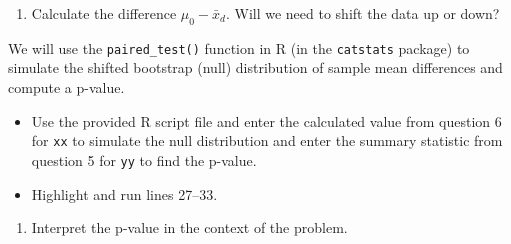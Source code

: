 \documentclass[
]{report}
\newenvironment{Shaded}{\begin{snugshade}}{\end{snugshade}}
\newcommand{\AttributeTok}[1]{\textcolor[rgb]{0.13,0.29,0.53}{#1}}
\newcommand{\CommentTok}[1]{\textcolor[rgb]{0.56,0.35,0.01}{\textit{#1}}}
\newcommand{\DecValTok}[1]{\textcolor[rgb]{0.00,0.00,0.81}{#1}}
\newcommand{\FunctionTok}[1]{\textcolor[rgb]{0.13,0.29,0.53}{\textbf{#1}}}
\newcommand{\NormalTok}[1]{#1}
\newcommand{\SpecialCharTok}[1]{\textcolor[rgb]{0.81,0.36,0.00}{\textbf{#1}}}
\newcommand{\StringTok}[1]{\textcolor[rgb]{0.31,0.60,0.02}{#1}}
\providecommand{\tightlist}{%
  \setlength{\itemsep}{0pt}\setlength{\parskip}{0pt}}
\begin{document}
\begin{enumerate}
\def\labelenumi{\arabic{enumi}.}
\setcounter{enumi}{5}
\tightlist
\item
  Calculate the difference \(\mu_0 - \bar{x}_d\). Will we need to shift the data up or down?
\end{enumerate}

\vspace{.7in}
\newpage

We will use the \texttt{paired\_test()} function in R (in the \texttt{catstats} package) to simulate the shifted bootstrap (null) distribution of sample mean differences and compute a p-value.

\begin{itemize}
\item
  Use the provided R script file and enter the calculated value from question 6 for \texttt{xx} to simulate the null distribution and enter the summary statistic from question 5 for \texttt{yy} to find the p-value.
\item
  Highlight and run lines 27--33.
\end{itemize}

\begin{Shaded}
\end{Shaded}

\begin{enumerate}
\def\labelenumi{\arabic{enumi}.}
\setcounter{enumi}{6}
\tightlist
\item
  Interpret the p-value in the context of the problem.
  \vspace{1in}
\end{enumerate}
\end{document}
